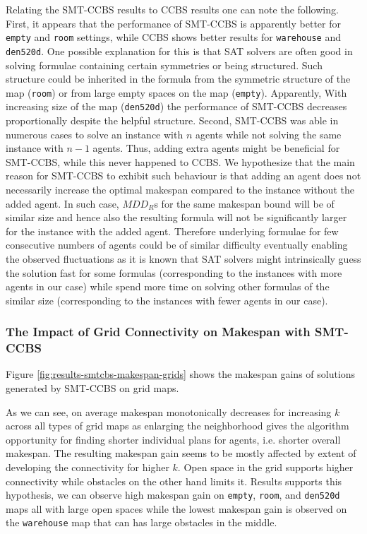 \documentclass[review]{elsarticle}
\newcommand{\mddrs}{\ensuremath{MDD_R}s\xspace}
\newcommand{\ccbs}{\ac{CCBS}\xspace}
\newcommand{\smtccbs}{SMT-CCBS\xspace}
\begin{document}
Relating the \smtccbs results to \ccbs results one can note the following. First, it appears that the performance of \smtccbs is apparently better for \texttt{empty} and \texttt{room} settings, while \ccbs shows better results for \texttt{warehouse} and \texttt{den520d}. One possible explanation for this is that SAT solvers are often good in solving formulae containing certain symmetries or being structured. Such structure could be inherited in the formula from the symmetric structure of the map (\texttt{room}) or from large empty spaces on the map (\texttt{empty}). Apparently, With increasing size of the map (\texttt{den520d}) the performance of \smtccbs decreases proportionally despite the helpful structure.
Second, \smtccbs was able in numerous cases to solve an instance with $n$ agents while not solving the same instance with $n-1$ agents. Thus, adding extra agents might be beneficial for \smtccbs, while this never happened to \ccbs. We hypothesize that the main reason for \smtccbs to exhibit such behaviour is that adding an agent does not necessarily increase the optimal makespan compared to the instance without the added agent. In such case, \mddrs for the same makespan bound will be of similar size and hence also the resulting formula will not be significantly larger for the instance with the added agent. Therefore underlying formulae for few consecutive numbers of agents could be of similar difficulty eventually enabling the observed fluctuations as it is known that SAT solvers  might intrinsically guess the solution fast for some formulas (corresponding to the instances with more agents in our case) while spend more time on solving other formulas of the similar size (corresponding to the instances with fewer agents in our case).




\subsubsection{The Impact of Grid Connectivity on Makespan with \smtccbs}
Figure \ref{fig:results-smtcbs-makespan-grids} shows the makespan gains of solutions generated by \smtccbs on grid maps.

As we can see, on average makespan monotonically decreases for increasing $k$ across all types of grid maps as enlarging the neighborhood gives the algorithm opportunity for finding shorter individual plans for agents, i.e. shorter overall makespan.
The resulting makespan gain seems to be mostly affected by extent of developing the connectivity for higher $k$. Open space in the grid supports higher connectivity while obstacles on the other hand limits it. Results supports this hypothesis, we can observe high makespan gain on \texttt{empty}, \texttt{room}, and \texttt{den520d} maps all with large open spaces while the lowest makespan gain is observed on the \texttt{warehouse} map that can has large obstacles in the middle.
\end{document}
